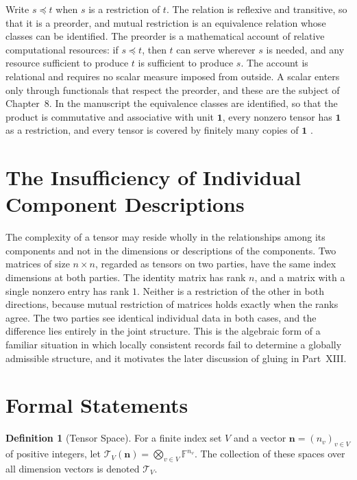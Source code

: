\documentclass[11pt,letterpaper]{report}
\theoremstyle{plain}
\theoremstyle{definition}
\newtheorem{definition}[theorem]{Definition}
\theoremstyle{remark}
\begin{document}
Write $s\preceq t$ when $s$ is a restriction of $t$. The relation is reflexive and transitive, so that it is a preorder, and mutual restriction is an equivalence relation whose classes can be identified. The preorder is a mathematical account of relative computational resources: if $s\preceq t$, then $t$ can serve wherever $s$ is needed, and any resource sufficient to produce $t$ is sufficient to produce $s$. The account is relational and requires no scalar measure imposed from outside. A scalar enters only through functionals that respect the preorder, and these are the subject of Chapter~8. In the manuscript the equivalence classes are identified, so that the product is commutative and associative with unit $\mathbf 1$, every nonzero tensor has $\mathbf 1$ as a restriction, and every tensor is covered by finitely many copies of $\mathbf 1$ \cite{Source2026}.

\section{The Insufficiency of Individual Component Descriptions}

The complexity of a tensor may reside wholly in the relationships among its components and not in the dimensions or descriptions of the components. Two matrices of size $n\times n$, regarded as tensors on two parties, have the same index dimensions at both parties. The identity matrix has rank $n$, and a matrix with a single nonzero entry has rank $1$. Neither is a restriction of the other in both directions, because mutual restriction of matrices holds exactly when the ranks agree. The two parties see identical individual data in both cases, and the difference lies entirely in the joint structure. This is the algebraic form of a familiar situation in which locally consistent records fail to determine a globally admissible structure, and it motivates the later discussion of gluing in Part~XIII.

\section{Formal Statements}

\begin{definition}[Tensor Space]
For a finite index set $V$ and a vector $\mathbf n=(n_v)_{v\in V}$ of positive integers, let $\mathcal T_V(\mathbf n)=\bigotimes_{v\in V}\mathbb F^{n_v}$. The collection of these spaces over all dimension vectors is denoted $\mathcal T_V$.
\end{definition}
\end{document}
